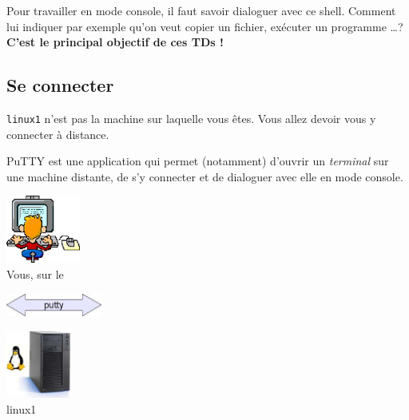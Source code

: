\documentclass[a4paper,11pt]{style-esi/td}
\begin{document}
		Pour travailler en mode console, il faut savoir dialoguer avec ce shell. 
		Comment lui indiquer par exemple qu'on veut copier un fichier, 
		exécuter un programme \dots ? 
		\textbf{C'est le principal objectif de ces TDs !}

\newpage
	\subsection{Se connecter}

		\verb_linux1_ n'est pas la machine sur laquelle vous êtes.
		Vous allez devoir vous y connecter à distance.

		\begin{theorie}{PuTTY}
			\textbf{} est une application qui permet (notamment)
			d'ouvrir un \emph{terminal} sur une machine distante, 
			de s'y connecter et de dialoguer avec elle en mode console.
		\end{theorie}

		\begin{colxbox}[colback=white,halign=center,drop fuzzy shadow]
		\begin{centering}
			\begin{minipage}{10em}
				\centering
				\includegraphics[height=6em]{images/putty1}\\
				{\footnotesize Vous, sur le  }
			\end{minipage}
			\qquad
			\begin{minipage}{8em}
				\centering
				\includegraphics[height=2em]{images/putty2}
			\end{minipage}
			\qquad
			\begin{minipage}{10em}
				\centering
				\includegraphics[height=6em]{images/putty3}\\
				{\footnotesize linux1}
			\end{minipage}
		\end{centering}
		\end{colxbox}
\end{document}
